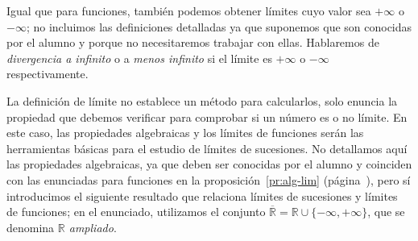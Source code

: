 Igual que para funciones, también podemos obtener límites cuyo valor sea $+\infty$ o $-\infty$;
no incluimos las definiciones detalladas ya que suponemos que son conocidas por el alumno y porque no necesitaremos trabajar con ellas.
Hablaremos de \emph{divergencia a infinito} o a \emph{menos infinito} si el límite es $+\infty$ o $-\infty$ respectivamente.

La definición de límite no establece un método para calcularlos, solo enuncia la propiedad que debemos verificar para comprobar si un número es o no límite.
En este caso, las propiedades algebraicas y los límites de funciones serán las herramientas básicas para el estudio de límites de sucesiones.
No detallamos aquí las propiedades algebraicas, ya que deben ser conocidas por el alumno y coinciden
con las enunciadas para funciones en la proposición~\ref{pr:alg-lim} (página~\pageref{pr:alg-lim}), pero sí introducimos el siguiente resultado que relaciona límites de sucesiones y límites de funciones;
en el enunciado, utilizamos el conjunto $\overline{\mathbb{R}}=\mathbb{R}\cup \{-\infty,+\infty \}$, que se denomina \emph{$\mathbb{R}$ ampliado}.

